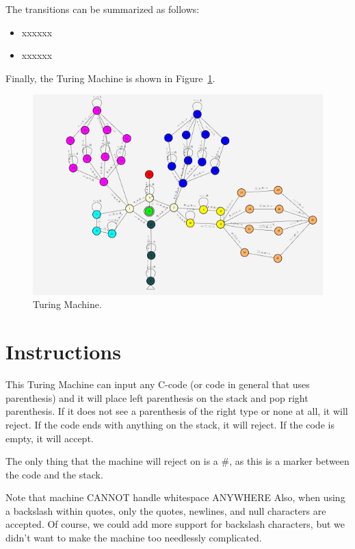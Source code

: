 \documentclass{article}
\begin{document}
The transitions can be summarized as follows:
\begin{itemize}
    \item xxxxxx
    \item xxxxxx
\end{itemize}

Finally, the Turing Machine is shown in Figure\ \ref{fig:stackqueue}.
\begin{figure}
    \includegraphics[width=\linewidth]{stackqueue.png}
    \caption{Turing Machine.}\label{fig:stackqueue}
\end{figure}

\section{Instructions}
This Turing Machine can input any C-code (or code in general that uses parenthesis) and it will place left parenthesis on the stack and pop
right parenthesis. If it does not see a parenthesis of the right type or none at all, it will reject. If the code ends with anything on the
stack, it will reject. If the code is empty, it will accept. 

The only thing that the machine will reject on is a $\#$, as this is a marker between the code and the stack.

Note that machine CANNOT handle whitespace ANYWHERE
Also, when using a backslash within quotes, only the quotes, newlines, and null characters are accepted.
Of course, we could add more support for backslash characters, but we didn't want to make the machine too needlessly complicated.
\end{document}
